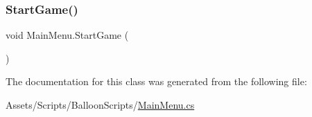 \subsubsection{\texorpdfstring{Start\+Game()}{StartGame()}}
{\footnotesize\ttfamily void Main\+Menu.\+Start\+Game (\begin{DoxyParamCaption}{ }\end{DoxyParamCaption})\hspace{0.3cm}{\ttfamily [inline]}}



The documentation for this class was generated from the following file\+:\begin{DoxyCompactItemize}
\item 
Assets/\+Scripts/\+Balloon\+Scripts/\hyperlink{MainMenu_8cs}{Main\+Menu.\+cs}\end{DoxyCompactItemize}
